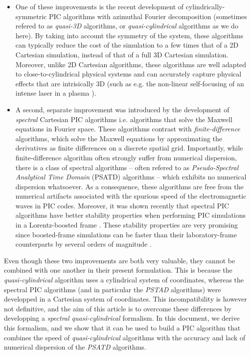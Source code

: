 \documentclass[1p,times,authoryear]{elsarticle}
\begin{document}
\begin{itemize}
\item One of these improvements is the recent
  development of cylindrically-symmetric
PIC algorithms with azimuthal Fourier decomposition \citep{Lifschitz,Davidson} 
(sometimes refered to as \emph{quasi-3D} algorithms, or
\emph{quasi-cylindrical} algorithms as we do here). By taking
into account the symmetry of the system, these algorithms can typically reduce
the cost of the simulation to a few times that of a 2D Cartesian simulation,
instead of that of a full 3D Cartesian simulation. Moreover, unlike 2D
Cartesian algorithms, these algorithms are well adapted to close-to-cylindrical
physical systems and can accurately capture physical effects that are intrisically
3D (such as e.g. the non-linear self-focusing of an intense laser in a
plasma \citep{EsareyRMP2009}).

\item A second, separate improvement was introduced by the development
  of \emph{spectral} Cartesian PIC algorithms
  \citep{BunemanJCP1980,DawsonRMP1983} i.e. algorithms that solve the
  Maxwell equations in Fourier space. These algorithms contrast with
  \emph{finite-difference} algorithms, which solve the Maxwell equations
  by approximating the derivatives as finite differences on a discrete spatial grid.
Importantly, while finite-difference algorithm often strongly suffer from
numerical dispersion, there is a class of spectral algorithms -- often refered to
as \emph{Pseudo-Spectral Analytical Time Domain} (PSATD) algorithms 
\citep{Haber} -- which exhibits no numerical dispersion whatsoever. As a
consequence, these algorithms are free from the numerical artifacts
associated with the spurious speed of the electromagnetic waves in PIC
codes. Moreover, it was shown recently
\citep{XuJCP2013,YuJCP2014,YuCPC2015,
GodfreyIEEE2014,GodfreyJCP2014} 
that spectral PIC algorithms have better stability properties when 
performing PIC simulations in
a Lorentz-boosted frame \citep{VayPRL2007,MartinsNatPhys2010}. 
These stability properties are very
promising since boosted-frame simulations can be faster than 
their laboratory-frame counterparts by several orders of magnitude \citep{VayPRL2007}.
\end{itemize}

Even though these two improvements are both very valuable, they cannot be
combined with one another in their present
formulation. This is because the \emph{quasi-cylindrical} algorithm uses a
cylindrical system of coordinates, whereas the spectral PIC algorithms
(and in particular the \emph{PSTAD} algorithms)
were developped in a Cartesian system of coordinates. This
incompatibility is however not definitive, and the aim of this article
is to overcome these differences by developping a \emph{spectral
  quasi-cylindrical} formalism. In this document, we derive this formalism,
and we show that it can be used to build a PIC algorithm that combines 
the speed of \emph{quasi-cylindrical} algorithms with
the accuracy and lack of numerical dispersion of the \emph{PSATD} algorithms.
\end{document}

